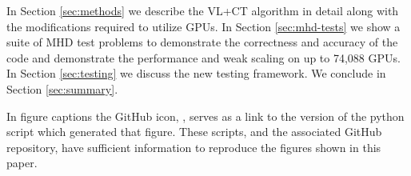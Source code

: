 In Section \ref{sec:methods} we describe the VL+CT algorithm in detail along with the modifications required to utilize GPUs. 
In Section \ref{sec:mhd-tests} we show a suite of MHD test problems to demonstrate the correctness and accuracy of the code and demonstrate the performance and weak scaling on up to 74,088 GPUs.
In Section \ref{sec:testing} we discuss the new testing framework. 
We conclude in Section \ref{sec:summary}. 

In figure captions the GitHub icon, , serves as a link to the version of the python script which generated that figure. These scripts, and the associated GitHub repository, have sufficient information to reproduce the figures shown in this paper.